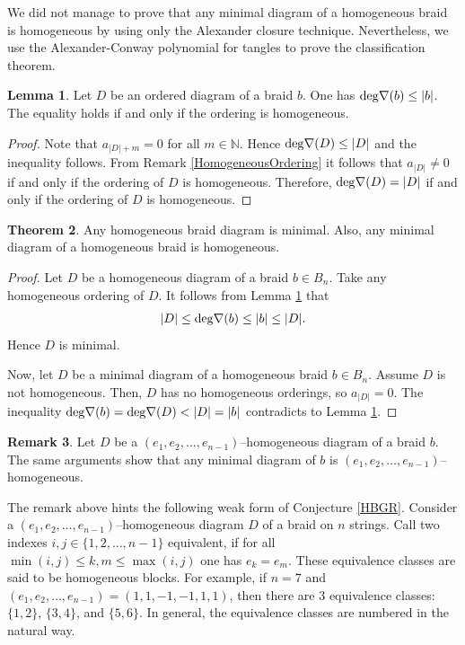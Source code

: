 \documentclass[11pt]{amsart}
\theoremstyle{plain}
\theoremstyle{definition}
\newtheorem{Theorem}{Theorem}[section]
\newtheorem{Lemma}[Theorem]{Lemma}
\newtheorem{Remark}[Theorem]{Remark}
\numberwithin{equation}{section}
\begin{document}
We did not manage to prove that any minimal diagram of a homogeneous braid is homogeneous by using only the Alexander closure technique. Nevertheless, we use the Alexander-Conway polynomial for tangles to prove the classification theorem.

\begin{Lemma}\label{Inequalities}
Let $D$ be an ordered diagram of a braid $b$. One has ${\rm deg} \nabla(b) \leq |b|$. The equality holds if and only if the ordering is homogeneous.
\end{Lemma}
\begin{proof}
Note that $a_{|D|+m} = 0$ for all $m \in \mathbb{N}$. Hence ${\rm deg} \nabla(D) \leq |D|$ and the inequality follows. From Remark \ref{HomogeneousOrdering} it follows that $a_{|D|} \neq 0$ if and only if the ordering of $D$ is homogeneous. Therefore, ${\rm deg} \nabla(D) = |D|$ if and only if the ordering of $D$ is homogeneous.
\end{proof}

\begin{Theorem}\label{HomogeneousAreGeodesic}
Any homogeneous braid diagram is minimal. Also, any minimal diagram of a homogeneous braid is homogeneous.
\end{Theorem}
\begin{proof}
Let $D$ be a homogeneous diagram of a braid $b \in B_n$. Take any homogeneous ordering of $D$. It follows from Lemma \ref{Inequalities} that
\begin{align*}
|D| \leq {\rm deg} \nabla(b) \leq |b| \leq |D|.    
\end{align*}
Hence $D$ is minimal.

Now, let $D$ be a minimal diagram of a homogeneous braid $b \in B_n$. Assume $D$ is not homogeneous. Then, $D$ has no homogeneous orderings, so $a_{|D|}=0$. The inequality ${\rm deg} \nabla(b)={\rm deg} \nabla(D) < |D| = |b|$ contradicts to Lemma \ref{Inequalities}.
\end{proof}

\begin{Remark}
Let $D$ be a $(e_1,e_2, \ldots, e_{n-1})$--homogeneous diagram of a braid $b$. The same arguments show that any minimal diagram of $b$ is $(e_1,e_2, \ldots, e_{n-1})$--homogeneous.
\end{Remark}

The remark above hints the following weak form of Conjecture \ref{HBGR}. Consider a $(e_1, e_2, \ldots, e_{n-1})$--homogeneous diagram $D$ of a braid on $n$ strings. Call two indexes $i,j \in \{1,2,\ldots,n-1\}$ equivalent, if for all $\min(i,j) \leq k,m \leq \max(i,j)$ one has $e_k = e_m$. These equivalence classes are said to be homogeneous blocks. For example, if $n=7$ and $(e_1, e_2, \ldots, e_{n-1}) = (1,1,-1,-1,1,1)$, then there are 3 equivalence classes: $\{1,2\}$, $\{3,4\}$, and $\{5,6\}$. In general, the equivalence classes are numbered in the natural way.
\end{document}
